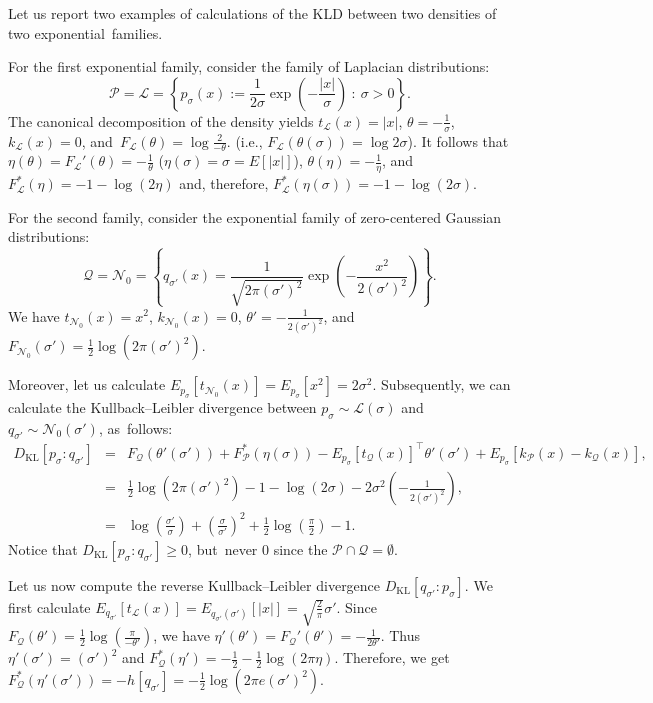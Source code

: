 \documentclass[entropy,article,accept,oneauthor,pdftex,entropy]{Definitions/mdpi}
\def\calL{\mathcal{L}}
\def\calQ{\mathcal{Q}}
\def\KL{\mathrm{KL}}
\def\calN{\mathcal{N}}
\def\calQ{\mathcal{Q}}
\def\calP{\mathcal{P}}
\begin{document}
\begin{paracol}{2}
Let us report two examples of calculations of the KLD between two densities of two exponential~families.

\begin{Example}
For the first exponential family, consider the  family of Laplacian distributions:
$$
\calP=\calL=\left\{p_\sigma(x):=\frac{1}{2\sigma}\exp\left(-\frac{|x|}{\sigma}\right)\ :\ \sigma>0\right\}.
$$
The canonical decomposition of the density yields
 $t_\calL(x)=|x|$, $\theta=-\frac{1}{\sigma}$, $k_{\calL}(x)=0$, and~$F_\calL(\theta)=\log\frac{2}{-\theta}$.  
(i.e., $F_\calL(\theta(\sigma))=\log{2\sigma}$).
It follows that $\eta(\theta)=F_\calL'(\theta)=-\frac{1}{\theta}$  ($\eta(\sigma)=\sigma=E[|x|]$), $\theta(\eta)=-\frac{1}{\eta}$,
and $F_\calL^*(\eta)=-1-\log(2\eta)$ and, therefore, $F_\calL^*(\eta(\sigma))=-1-\log(2\sigma)$.

For the second family, consider the exponential family of zero-centered Gaussian distributions:
$$
\calQ=\calN_0=\left\{q_{\sigma'}(x)=\frac{1}{\sqrt{2\pi(\sigma')^2}}\exp\left(-\frac{x^2}{2(\sigma')^2}\right)\right\}.
$$
We have $t_{\calN_0}(x)=x^2$, $k_{\calN_0}(x)=0$, $\theta'=-\frac{1}{2(\sigma')^2}$, and~
$F_{\calN_0}(\sigma')=\frac{1}{2}\log(2\pi(\sigma')^2)$.

Moreover, let us calculate $E_{p_\sigma}[t_{\calN_0}(x)]=E_{p_{\sigma}}[x^2]=2\sigma^2$.
Subsequently, we can calculate the Kullback--Leibler divergence between $p_{\sigma}\sim\calL(\sigma)$ and $q_{\sigma'}\sim\calN_0(\sigma')$, as~follows:
\begingroup\makeatletter\def\f@size{9}\check@mathfonts
\def\maketag@@@#1{\hbox{\m@th\normalsize\normalfont#1}}%
\begin{eqnarray}
D_\KL[p_{\sigma}:q_{\sigma'}] &=& 
F_\calQ(\theta'(\sigma'))+F_\calP^*(\eta(\sigma))-E_{p_{\sigma}}[t_\calQ(x)]^\top\theta'(\sigma') +E_{p_{\sigma}}[k_\calP(x)-k_\calQ(x)],\\
&=& \frac{1}{2}\log(2\pi(\sigma')^2) - 1-\log(2\sigma) -2\sigma^2 \left(-\frac{1}{2(\sigma')^2}\right),\\
&=&\log\left(\frac{\sigma'}{\sigma}\right) +\left(\frac{\sigma}{\sigma'}\right)^2+\frac{1}{2}\log\left(\frac{\pi}{2}\right)-1.
\end{eqnarray}
\endgroup
Notice that $D_\KL[p_{\sigma}:q_{\sigma'}]\geq 0$, but~never $0$ since the $\calP\cap\calQ=\emptyset$.

Let us now compute the reverse Kullback--Leibler divergence $D_\KL[q_{\sigma'}:p_{\sigma}]$. 
We first calculate $E_{q_{\sigma'}}[t_{\calL}(x)]=E_{q_{\sigma'}(\sigma')}[|x|]=\sqrt{\frac{2}{\pi}}\sigma'$.
Since $F_\calQ(\theta')=\frac{1}{2}\log(\frac{\pi}{-\theta'})$, we have $\eta'(\theta')=F_\calQ'(\theta')=-\frac{1}{2\theta'}$.
Thus $\eta'(\sigma')=(\sigma')^2$ and $F^*_\calQ(\eta')=-\frac{1}{2}-\frac{1}{2}\log(2\pi\eta)$.
Therefore, we get $F_\calQ^*(\eta'(\sigma'))=-h[q_{\sigma'}]=-\frac{1}{2}\log(2\pi e(\sigma')^2)$.


\end{Example}
\end{paracol}
\end{document}
